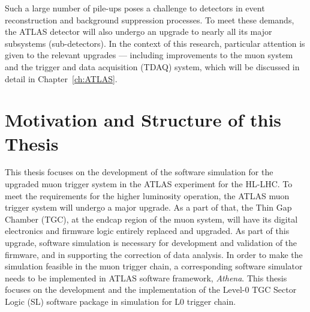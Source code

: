 Such a large number of pile-ups poses a challenge to detectors in event reconstruction and background suppression processes. To meet these demands, the ATLAS detector will also undergo an upgrade to nearly all its major subsystems (sub-detectors). In the context of this research, particular attention is given to the relevant upgrades — including improvements to the muon system and the trigger and data acquisition (TDAQ) system, which will be discussed in detail in Chapter~\ref{ch:ATLAS}.

\section{Motivation and Structure of this Thesis} \label{sec:motivation}
This thesis focuses on the development of the software simulation for the upgraded muon trigger system in the ATLAS experiment for the HL-LHC. To meet the requirements for the higher luminosity operation, the ATLAS muon trigger system will undergo a major upgrade. As a part of that, the Thin Gap Chamber (TGC), at the endcap region of the muon system, will have its digital electronics and firmware logic entirely replaced and upgraded. As part of this upgrade, software simulation is necessary for development and validation of the firmware, and in supporting the correction of data analysis. In order to make the simulation feasible in the muon trigger chain, a corresponding software simulator needs to be implemented in ATLAS software framework, \textit{Athena}. This thesis focuses on the development and the implementation of the Level-0 TGC Sector Logic (SL) software package in simulation for L0 trigger chain.

